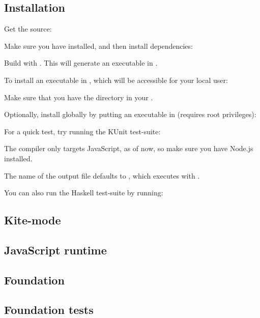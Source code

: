 
\subsection{Installation}
\label{installation}
Get the source:

\quad{}

Make sure you have  installed, and then install dependencies:

\quad{}

Build with . This will generate an executable in .

\quad{}

To install an executable in , which will be accessible for your local user:

\quad{}

Make sure that you have the  directory in your .

Optionally, install globally by putting an executable in  (requires root privileges):

\quad{}

For a quick test, try running the KUnit test-suite:

\quad{}

The compiler only targets JavaScript, as of now, so make sure you have Node.js installed.

The name of the output file defaults to , which executes with .

\quad{}

You can also run the Haskell test-suite by running:

\quad{}

\subsection{Kite-mode}
\label{kite-mode}


\subsection{JavaScript runtime}
\label{kt-runtime}


\subsection{Foundation}
\label{foundation}


\subsection{Foundation tests}
\label{sec:foundation-tests}

